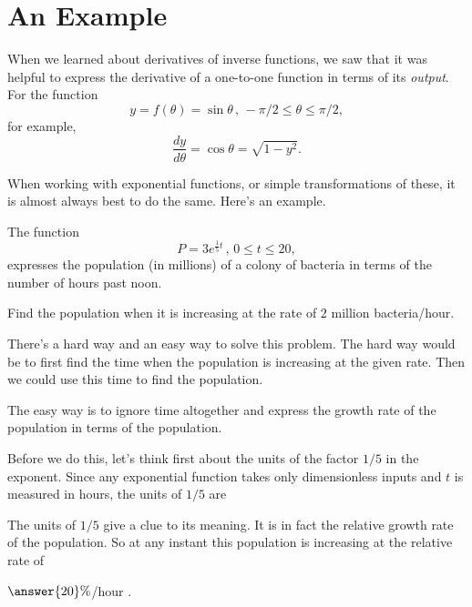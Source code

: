 \documentclass{ximera}
\begin{document}
\section{An Example}

When we learned about derivatives of inverse functions, we saw that it was helpful to express the derivative of a one-to-one function in terms of its \emph{output}. For the function
\[
 y = f(\theta) = \sin\theta \, , \, -\pi/2 \leq \theta \leq \pi/2,
\]
for example, 
\[
    \frac{dy}{d\theta} = \cos\theta = \sqrt{1-y^2}.
\]

When working with exponential functions, or simple transformations of these, it is almost always best to do the same. Here's an example.

\begin{example}  \label{Ex:KDFDFL}
The function
\[
       P = 3e^{\frac{1}{5}t} \, , \, 0\leq t \leq 20 ,
\]
expresses the population (in millions) of a colony of bacteria in terms of the number of hours past noon.

Find the population when it is increasing at the rate of $2$ million bacteria/hour.

\begin{explanation}
There's a hard way and an easy way to solve this problem. The hard way would be to first find the time when the population is increasing at the given rate. Then we could use this time to find the population.

The easy way is to ignore time altogether and express the growth rate of the population in terms of the population.

Before we do this, let's think first about the units of the factor $1/5$ in the exponent. Since any exponential function takes only dimensionless inputs and $t$ is measured in hours, the units of $1/5$ are 
\begin{question} \label{EROERERER}
\begin{multipleChoice}
\end{multipleChoice}
\end{question}

The units of $1/5$ give a clue to its meaning. It is in fact the relative growth rate of the population. So at any instant this population is increasing at the relative rate of 
\begin{question} \label{QERERERERER}
 $\answer{20}\%$/hour .
\end{question}


\end{explanation}
\end{example}
\end{document}

